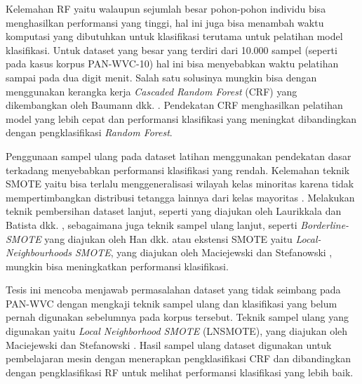 Kelemahan RF yaitu walaupun sejumlah besar pohon-pohon individu
bisa menghasilkan performansi yang tinggi, hal ini juga bisa menambah waktu
komputasi yang dibutuhkan untuk klasifikasi terutama untuk pelatihan model
klasifikasi.
Untuk dataset yang besar yang terdiri dari 10.000 sampel (seperti pada kasus
korpus PAN-WVC-10) hal ini bisa menyebabkan waktu pelatihan sampai pada dua
digit menit.
Salah satu solusinya mungkin bisa dengan menggunakan kerangka kerja
\textit{Cascaded Random Forest} (CRF)
yang dikembangkan oleh Baumann dkk.
\cite{baumann2013cascaded}.
Pendekatan CRF menghasilkan pelatihan model yang lebih cepat dan performansi
klasifikasi yang meningkat dibandingkan dengan pengklasifikasi \textit{Random
Forest}.

Penggunaan sampel ulang pada dataset latihan menggunakan pendekatan dasar
terkadang menyebabkan performansi klasifikasi yang rendah.
Kelemahan teknik SMOTE yaitu bisa terlalu menggeneralisasi wilayah kelas
minoritas karena tidak mempertimbangkan distribusi tetangga lainnya dari
kelas mayoritas
\cite{maciejewski2011local}.
Melakukan teknik pembersihan dataset lanjut, seperti yang diajukan oleh
Laurikkala
\cite{laurikkala2001improving}
dan Batista dkk.
\cite{batista2004study},
sebagaimana juga teknik sampel ulang lanjut, seperti
\textit{Borderline-SMOTE}
yang diajukan oleh Han dkk.
\cite{han2005borderline}
atau ekstensi SMOTE yaitu \textit{Local-Neighbourhoods SMOTE}, yang diajukan
oleh Maciejewski dan Stefanowski
\cite{maciejewski2011local},
mungkin bisa meningkatkan performansi klasifikasi.

Tesis ini mencoba menjawab permasalahan dataset yang tidak seimbang pada
PAN-WVC dengan mengkaji teknik sampel ulang dan klasifikasi yang belum pernah
digunakan sebelumnya pada korpus tersebut.
Teknik sampel ulang yang digunakan yaitu
\textit{Local Neighborhood SMOTE} (LNSMOTE),
yang diajukan oleh Maciejewski dan
Stefanowski
\cite{maciejewski2011local}.
Hasil sampel ulang dataset digunakan untuk pembelajaran mesin dengan menerapkan
pengklasifikasi CRF dan dibandingkan dengan pengklasifikasi RF untuk melihat
performansi klasifikasi yang lebih baik.
